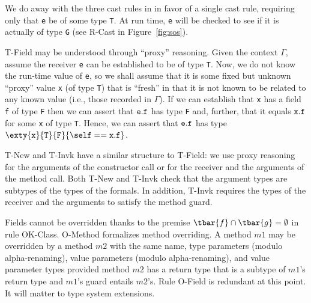 
We do away with the three cast rules in \FJ{} in favor of a single
cast rule, requiring only that {\tt e} be of some type {\tt T}. At run time,
{\tt e} will be checked to see if it is actually of type {\tt G} (see
{\sc R-Cast} in Figure~\ref{fig:sos}).

{\sc T-Field} may be understood through ``proxy'' reasoning.
Given the context $\Gamma$, assume the receiver {\tt e} can
be established to be of type {\tt T}. Now, we do not know the run-time
value of {\tt e}, so we shall assume that it is some fixed but unknown
``proxy'' value {\tt x} (of type {\tt T}) that is ``fresh'' in that it
is not known to be related to any known value (i.e., those recorded
in $\Gamma$).  If we can establish that {\tt x} has a field {\tt f} of
type {\tt F} then we can assert that
${\tt e}.{\tt f}$ has type {\tt F} and, further, that it equals ${\tt x}.{\tt f}$
for some {\tt x} of type {\tt T}.
Hence, we can assert that ${\tt e}.{\tt f}$ has type 
$\exty{\tt x}{\tt T}{\tt F}\{\self=={\tt x}.{\tt f}\}$.

{\sc T-New} and {\sc T-Invk} have a similar structure to {\sc T-Field}: we use
proxy reasoning for the arguments of the constructor call or for the receiver and the arguments of the method
call. Both {\sc T-New} and {\sc T-Invk} check that the argument types are subtypes of the types of the formals.
In addition, {\sc T-Invk} requires the types of the receiver and the arguments to satisfy the method guard.

Fields cannot be overridden thanks to the premise $\tbar{f}\cap\tbar{g}=\emptyset$ in rule {\sc OK-Class}. {\sc O-Method} formalizes method overriding. A method $m1$ may be overridden by a method $m2$ with the same name, type parameters (modulo alpha-renaming), value parameters (modulo alpha-renaming), and value parameter types provided method $m2$ has a return type that is a subtype of $m1$'s return type and $m1$'s guard entails $m2$'s. Rule {\sc O-Field} is redundant at this point. It will matter to type system extensions.

